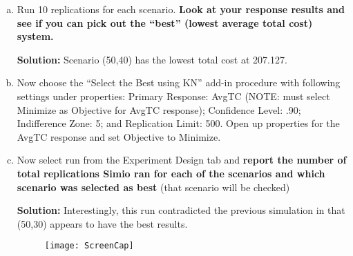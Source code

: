 \documentclass[12pt]{amsart}
\begin{document}
\begin{enumerate}[1.]
\begin{enumerate}[a.]
		\item Run 10 replications for each scenario. \textbf{Look at your response results and see if you
		can pick out the “best” (lowest average total cost) system.}
	
	\bigskip
	\textbf{Solution:}
	Scenario (50,40) has the lowest total cost at 207.127.
	\bigskip
	
		\item Now choose the “Select the Best using KN” add-in procedure with following settings
		under properties: Primary Response: AvgTC (NOTE: must select Minimize as Objective for 
		AvgTC response); Confidence Level: .90; Indifference Zone: 5; and Replication
		Limit: 500. Open up properties for the AvgTC response and set Objective to Minimize.
		
		\item Now select run from the Experiment Design tab and \textbf{report the number of total
		replications Simio ran for each of the scenarios and which scenario was selected as
		best} (that scenario will be checked)
		
	\bigskip
	\textbf{Solution:}
	Interestingly, this run contradicted the previous simulation in that (50,30) appears to have the best results.\\
	\bigskip
	\begin{figure}[h]
		\centering
		\texttt{[image: ScreenCap]}
		\caption{}
		\label{fig:screencap}
	\end{figure}
		
	\end{enumerate}
\end{enumerate}
	
\end{document}
